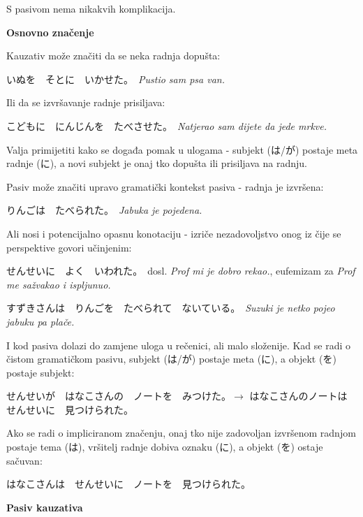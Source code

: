 \documentclass[12pt]{article}
\begin{document}
	S pasivom nema nikakvih komplikacija.
	
	\vspace{20pt}
	\normalsize \textbf{Osnovno značenje}
	\vspace{20pt}
	
	Kauzativ može značiti da se neka radnja dopušta:
	
	いぬを　そとに　いかせた。　\textit{Pustio sam psa van.}
	
	Ili da se izvršavanje radnje prisiljava:
	
	こどもに　にんじんを　たべさせた。　\textit{Natjerao sam dijete da jede mrkve.}
	
	Valja primijetiti kako se događa pomak u ulogama - subjekt (は/が) postaje meta radnje (に), a novi subjekt je onaj tko dopušta ili prisiljava na radnju.
	
	\vspace{10pt}
	
	Pasiv može značiti upravo gramatički kontekst pasiva - radnja je izvršena:
	
	りんごは　たべられた。　\textit{Jabuka je pojedena.}
	
	Ali nosi i potencijalno opasnu konotaciju - izriče nezadovoljstvo onog iz čije se perspektive govori učinjenim:
	
	せんせいに　よく　いわれた。　dosl. \textit{Prof mi je dobro rekao.}, eufemizam za \textit{Prof me sažvakao i ispljunuo.}
	
	すずきさんは　りんごを　たべられて　ないている。　\textit{Suzuki je netko pojeo jabuku pa plače.}
	
	I kod pasiva dolazi do zamjene uloga u rečenici, ali malo složenije. Kad se radi o čistom gramatičkom pasivu, subjekt (は/が) postaje meta (に), a objekt (を) postaje subjekt:
	
	せんせいが　はなこさんの　ノートを　みつけた。$\rightarrow$ はなこさんのノートは　せんせいに　見つけられた。
	
	Ako se radi o impliciranom značenju, onaj tko nije zadovoljan izvršenom radnjom postaje tema (は), vršitelj radnje dobiva oznaku (に), a objekt (を) ostaje sačuvan:
	
	はなこさんは　せんせいに　ノートを　見つけられた。
	
	
	\newpage
	\vspace{20pt}
	\normalsize \textbf{Pasiv kauzativa}
	\vspace{20pt}
	
\end{document}
